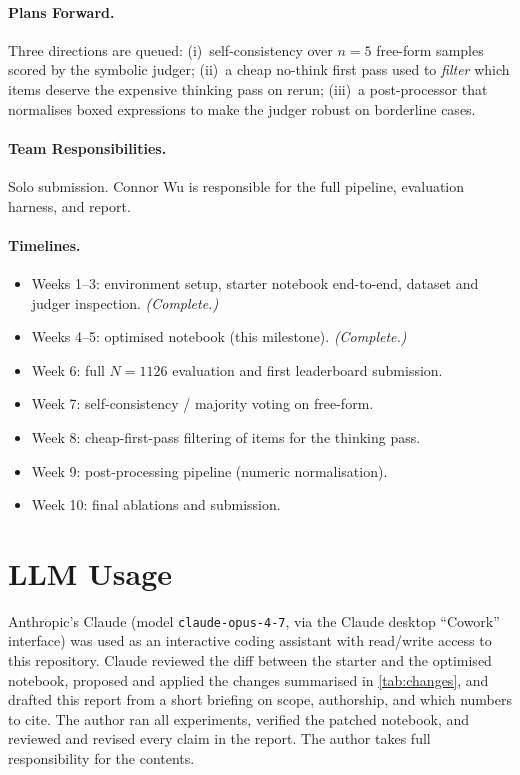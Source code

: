 \documentclass{article}
\begin{document}
\paragraph{Plans Forward.}
Three directions are queued: (i)~self-consistency over $n{=}5$ free-form
samples scored by the symbolic judger; (ii)~a cheap no-think first pass used
to \emph{filter} which items deserve the expensive thinking pass on rerun;
(iii)~a post-processor that normalises boxed expressions to make the judger
robust on borderline cases.

\paragraph{Team Responsibilities.}
Solo submission. Connor Wu is responsible for the full pipeline, evaluation
harness, and report.

\paragraph{Timelines.}
\begin{itemize}
    \item Weeks 1--3: environment setup, starter notebook end-to-end,
      dataset and judger inspection. \emph{(Complete.)}
    \item Weeks 4--5: optimised notebook (this milestone). \emph{(Complete.)}
    \item Week 6: full $N{=}1126$ evaluation and first leaderboard submission.
    \item Week 7: self-consistency / majority voting on free-form.
    \item Week 8: cheap-first-pass filtering of items for the thinking pass.
    \item Week 9: post-processing pipeline (numeric normalisation).
    \item Week 10: final ablations and submission.
\end{itemize}


\section*{LLM Usage}

Anthropic's Claude (model \texttt{claude-opus-4-7}, via the Claude desktop
``Cowork'' interface) was used as an interactive coding assistant with
read/write access to this repository. Claude reviewed the diff between the
starter and the optimised notebook, proposed and applied the changes
summarised in \cref{tab:changes}, and drafted this report from a short
briefing on scope, authorship, and which numbers to cite. The author ran all
experiments, verified the patched notebook, and reviewed and revised every
claim in the report. The author takes full responsibility for the contents.
\end{document}
